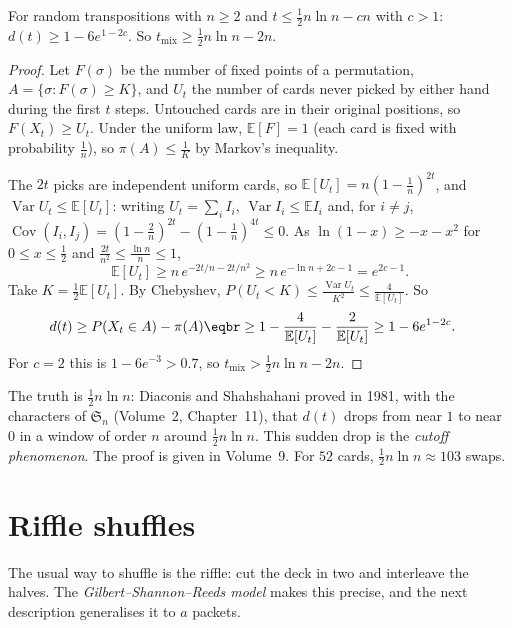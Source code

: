 \begin{proposition}\label{prop:translower}
For random transpositions with $n\ge2$ and $t\le\frac12n\ln n-cn$ with $c>1$: $d(t)\ge1-6e^{1-2c}$. So $t_{\mathrm{mix}}\ge\frac12n\ln n-2n$.
\end{proposition}
\begin{proof}
Let $F(\sigma)$ be the number of fixed points of a permutation, $A=\{\sigma:F(\sigma)\ge K\}$, and $U_t$ the number of cards never picked by either
hand during the first $t$ steps. Untouched cards are in their original positions, so $F(X_t)\ge U_t$. Under the uniform law,
$\mathbb E[F]=1$ (each card is fixed with probability $\frac1n$), so $\pi(A)\le\frac1K$ by Markov's inequality.

The $2t$ picks are independent uniform cards, so $\mathbb E[U_t]=n(1-\frac1n)^{2t}$, and $\operatorname{Var}U_t\le\mathbb E[U_t]$: writing $U_t=\sum_iI_i$, $\operatorname{Var}I_i\le\mathbb E I_i$ and, for
$i\ne j$, $\operatorname{Cov}(I_i,I_j)=(1-\frac2n)^{2t}-(1-\frac1n)^{4t}\le0$. As $\ln(1-x)\ge-x-x^2$ for $0\le x\le\frac12$ and $\frac{2t}{n^2}\le\frac{\ln n}n\le1$,
\[
\mathbb E[U_t]\ge n\,e^{-2t/n-2t/n^2}\ge n\,e^{-\ln n+2c-1}=e^{2c-1}.
\]
Take $K=\frac12\mathbb E[U_t]$. By Chebyshev, $P(U_t<K)\le\frac{\operatorname{Var}U_t}{K^2}\le\frac4{\mathbb E[U_t]}$. So
\[
\begin{aligned}d(t)&\ge P(X_t\in A)-\pi(A)\eqbr\ge1-\frac4{\mathbb E[U_t]}-\frac2{\mathbb E[U_t]}\ge1-6e^{1-2c}.\end{aligned}
\]
For $c=2$ this is $1-6e^{-3}>0.7$, so $t_{\mathrm{mix}}>\frac12n\ln n-2n$.
\end{proof}

\begin{remark}
The truth is $\frac12n\ln n$: Diaconis and Shahshahani proved in 1981, with the characters of $\mathfrak S_n$ (Volume~2, Chapter~11), that $d(t)$
drops from near $1$ to near $0$ in a window of order $n$ around $\frac12n\ln n$. This sudden drop is the \emph{cutoff phenomenon}. The proof
is given in Volume~9. For $52$ cards, $\frac12n\ln n\approx103$ swaps.
\end{remark}

\section{Riffle shuffles}

The usual way to shuffle is the riffle: cut the deck in two and interleave the halves. The \emph{Gilbert--Shannon--Reeds model}
makes this precise, and the next description generalises it to $a$ packets.

